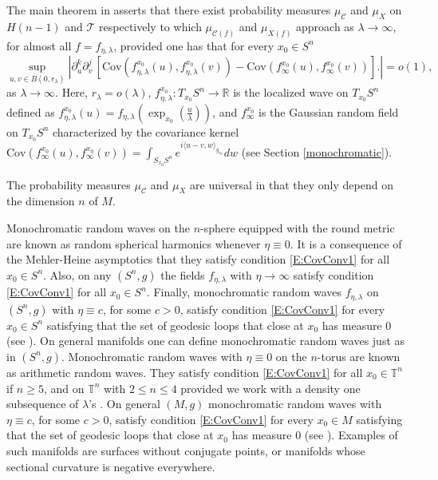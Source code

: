 \documentclass[11pt,reqno]{amsart}
\newcommand{\R}{{\mathbb R}}
\theoremstyle{definition}
\begin{document}
 
 The main theorem in \cite{SW} asserts that there exist probability measures $\mu_{\mathcal C}$ and $\mu_X$ on $H(n-1)$ and $\mathcal T$ respectively to which $\mu_{\mathcal C(f)}$ and $\mu_{X(f)}$  approach as  $\lambda \to \infty$, for almost all $f=f_{\eta, \lambda}$, 
 provided one has that for every $x_0 \in S^n$
\begin{equation}\label{E:CovConv1}
\sup_{u, v \in B(0,{r_\lambda})}  \left | \partial_u^k\partial_v^j \,\left[ \text{Cov}(f_{\eta,\lambda}^{x_0}(u),f_{\eta,\lambda}^{x_0}(v))- \text{Cov}(f_\infty^{x_0}(u), f_\infty^{x_0}(v)) \right]\big. \right|=o(1),
\end{equation}
as $\lambda\to \infty$. 
Here, $r_\lambda=o(\lambda)$,  $f_{\eta, \lambda}^{x_0}:T_{x_0}S^n \to \R$ is the localized wave on $T_{x_0}S^n$ defined as  $f_{\eta, \lambda}^{x_0}(u)= f_{\eta, \lambda}\left(\exp_{x_0}(\tfrac{u}{\lambda}) \right)$, and  $f_\infty^{x_0}$ is the Gaussian random field on $T_{x_0}S^n$ characterized by the covariance kernel  $\text{Cov}(f_\infty^{x_0}(u), f_\infty^{x_0}(v) )=\int_{S_{x_0}S^n} e^{i\langle{u-v}, {w}\rangle_{g_{x_0}}}dw$ (see Section \ref{monochromatic}).
 
 
 The  probability measures  $\mu_{\mathcal C}$ and $\mu_X$ are universal in that they only depend on the dimension $n$ of $M$.
 
Monochromatic random waves on the $n$-sphere equipped with the round metric are known as random spherical harmonics whenever $\eta\equiv 0$. It is a consequence of the Mehler-Heine \cite{Meh} asymptotics that  they satisfy condition \eqref{E:CovConv1} for all $x_0 \in S^n$.  Also, on any $(S^n,g)$ the fields $f_{\eta, \lambda}$ with $\eta \to \infty$ satisfy condition \eqref{E:CovConv1} for all $x_0 \in S^n$. Finally, monochromatic random waves  $f_{\eta, \lambda}$  on $(S^n,g)$ with $\eta \equiv c$, for some  $c>0$, satisfy condition  \eqref{E:CovConv1} for every $x_0 \in S^n$ satisfying that the set of geodesic loops that close at $x_0$ has measure $0$ (see \cite{CH}).
 On general manifolds one can define monochromatic random waves just as in $(S^n,g)$.
 Monochromatic random waves with $\eta\equiv 0$ on the $n$-torus are known as arithmetic random waves. They satisfy condition \eqref{E:CovConv1} for all $x_0 \in \mathbb T^n$ if $n\geq 5$, and on $\mathbb T^n$ with $2\leq n \leq 4$ provided we work with a density one subsequence of $\lambda$'s \cite{EEH}.
 On general $(M,g)$ monochromatic random waves with $\eta \equiv c$, for some  $c>0$, satisfy condition  \eqref{E:CovConv1} for every $x_0 \in M$ satisfying that the set of geodesic loops that close at $x_0$ has measure $0$ (see \cite{CH}).
 Examples of such manifolds are surfaces without conjugate points, or manifolds whose sectional curvature is negative everywhere.
\end{document}
